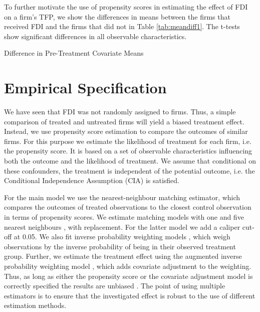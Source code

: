 \documentclass[a4paper,11pt]{scrartcl}
\begin{document}
To further motivate the use of propensity scores in estimating the effect of FDI on a firm's TFP, we show the differences in means between the firms that received FDI and the firms that did not in Table \ref{tab:meandiff1}. The t-tests show significant differences in all observable characteristics.%


\begin{table}[h!]
	\centering
	\caption{Difference in Pre-Treatment Covariate Means}
	\makebox[\textwidth]{
	}
	\label{tab:meandiff1}
\end{table}

\newpage
\section{Empirical Specification}

We have seen that FDI was not randomly assigned to firms. Thus, a simple comparison of treated and untreated firms will yield a biased treatment effect. Instead, we use propensity score estimation to compare the outcomes of similar firms. For this purpose we estimate the  likelihood of treatment for each firm, i.e. the propensity score. It is based on a set of observable characteristics influencing both the outcome and the likelihood of treatment. We assume that conditional on these confounders, the treatment is independent of the potential outcome, i.e. the Conditional Independence Assumption (CIA) is satisfied. 

For the main model we use the nearest-neighbour matching estimator, which compares the outcomes of treated observations to the closest control observation in terms of propensity scores. We estimate matching models with one %
and five nearest neighbours %
, with replacement. For the latter model we add a caliper cut-off at 0.05. We also fit inverse probability weighting models %
, which weigh observations by the inverse probability of being in their observed treatment group. Further, we estimate the treatment effect using the augmented inverse probability weighting model %
, which adds covariate adjustment to the weighting. Thus, as long as either the propensity score or the covariate adjustment model is correctly specified the results are unbiased \citep[p.~393]{imbens2015}. The point of using multiple estimators is %
 to ensure that the investigated effect is robust to the use of different estimation methods.  
\end{document}
